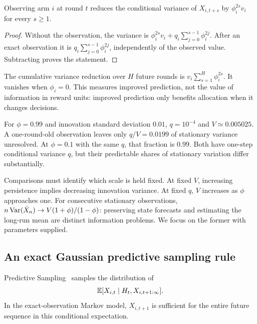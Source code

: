 \begin{proposition}
Observing arm $i$ at round $t$ reduces the conditional variance of $X_{i,t+s}$ by $\phi_i^{2s}v_i$ for every $s\geq1$.
\end{proposition}
\begin{proof}
Without the observation, the variance is
$\phi_i^{2s}v_i+q_i\sum_{j=0}^{s-1}\phi_i^{2j}$.
After an exact observation it is $q_i\sum_{j=0}^{s-1}\phi_i^{2j}$, independently of the observed value. Subtracting proves the statement.
\end{proof}
The cumulative variance reduction over $H$ future rounds is $v_i\sum_{s=1}^H\phi_i^{2s}$. It vanishes when $\phi_i=0$. This measures improved prediction, not the value of information in reward units: improved prediction only benefits allocation when it changes decisions.

For $\phi=0.99$ and innovation standard deviation $0.01$, $q=10^{-4}$ and $V\simeq0.005025$. A one-round-old observation leaves only $q/V=0.0199$ of stationary variance unresolved. At $\phi=0.1$ with the same $q$, that fraction is $0.99$. Both have one-step conditional variance $q$, but their predictable shares of stationary variation differ substantially.

Comparisons must identify which scale is held fixed. At fixed $V$, increasing persistence implies decreasing innovation variance. At fixed $q$, $V$ increases as $\phi$ approaches one. For consecutive stationary observations, $n\operatorname{Var}(\bar X_n)\to V(1+\phi)/(1-\phi)$: preserving state forecasts and estimating the long-run mean are distinct information problems. We focus on the former with parameters supplied.

\subsection{An exact Gaussian predictive sampling rule}
Predictive Sampling~\cite{collected10} samples the distribution of
\begin{equation}
\mathbb E[X_{i,t}\mid H_t,X_{i,t+1:\infty}].
\end{equation}
In the exact-observation Markov model, $X_{i,t+1}$ is sufficient for the entire future sequence in this conditional expectation.

